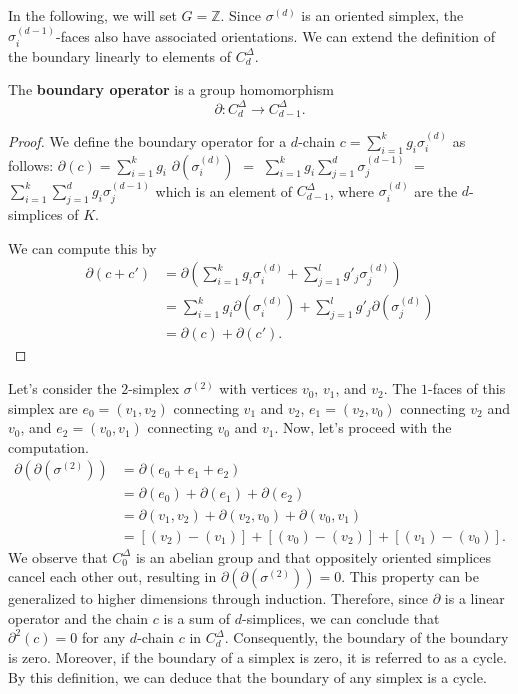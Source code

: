 In the following, we will set $G = \mathbb{Z}$. Since $\sigma^{(d)}$ is an oriented simplex, the $\sigma^{(d-1)}_i$-faces also have associated orientations. We can extend the definition of the boundary linearly to elements of $C^\Delta_d$.

\begin{lemma}
The \textbf{boundary operator} is a group homomorphism $$\partial: C^\Delta_d \rightarrow C^\Delta_{d-1}.$$
\end{lemma}
\begin{proof}
We define the boundary operator for a $d$-chain $c = \sum_{i=1}^{k} g_i \sigma_i^{(d)}$ as follows: $\partial(c) = \sum_{i=1}^{k} g_i$ $\partial(\sigma_i^{(d)})$ $=$ $\sum_{i=1}^{k} g_i \sum_{j=1}^{d} \sigma_j^{(d-1)}$ $=$ $\sum_{i=1}^{k} \sum_{j=1}^{d} g_i \sigma_j^{(d-1)}$ which is an element of $C^\Delta_{d-1}$, where $\sigma_i^{(d)}$ are the $d$-simplices of $K$.

We can compute this by
\begin{align}
\partial(c + c') &= \partial(\sum_{i=1}^{k} g_i \sigma_i^{(d)} + \sum_{j=1}^{l} g'_j \sigma_j^{(d)}) \\
&= \sum_{i=1}^{k} g_i \partial(\sigma_i^{(d)}) + \sum_{j=1}^{l} g'_j \partial(\sigma_j^{(d)}) \\
&= \partial(c) + \partial(c').
\end{align}
\end{proof}

\begin{example}
Let's consider the $2$-simplex $\sigma^{(2)}$ with vertices $v_0$, $v_1$, and $v_2$. The $1$-faces of this simplex are $e_0 = (v_1,v_2)$ connecting $v_1$ and $v_2$, $e_1 = (v_2,v_0)$ connecting $v_2$ and $v_0$, and $e_2 = (v_0,v_1)$ connecting $v_0$ and $v_1$. Now, let's proceed with the computation.
\begin{align}
\partial(\partial(\sigma^{(2)})) &= \partial (e_0+e_1+e_2) \\
&= \partial(e_0) + \partial(e_1) + \partial(e_2) \\
&= \partial(v_1,v_2) + \partial(v_2,v_0) + \partial(v_0,v_1) \\
&= [(v_2)-(v_1)] + [(v_0)-(v_2)]+[(v_1)-(v_0)].
\end{align}
We observe that $C^\Delta_0$ is an abelian group and that oppositely oriented simplices cancel each other out, resulting in $\partial(\partial(\sigma^{(2)})) = 0$. This property can be generalized to higher dimensions through induction. Therefore, since $\partial$ is a linear operator and the chain $c$ is a sum of $d$-simplices, we can conclude that $\partial^2(c) = 0$ for any $d$-chain $c$ in $C^\Delta_d$. Consequently, the boundary of the boundary is zero. Moreover, if the boundary of a simplex is zero, it is referred to as a cycle. By this definition, we can deduce that the boundary of any simplex is a cycle.
\end{example}

